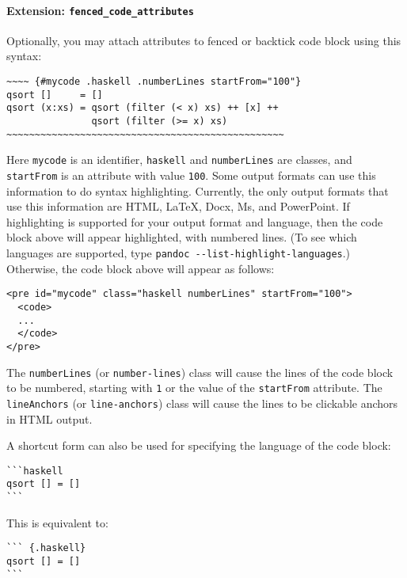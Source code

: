 \documentclass[
]{article}
\begin{document}
\paragraph{\texorpdfstring{Extension:
\texttt{fenced\_code\_attributes}}{Extension: fenced\_code\_attributes}}\label{extension-fenced_code_attributes}

Optionally, you may attach attributes to fenced or backtick code block
using this syntax:

\begin{verbatim}
~~~~ {#mycode .haskell .numberLines startFrom="100"}
qsort []     = []
qsort (x:xs) = qsort (filter (< x) xs) ++ [x] ++
               qsort (filter (>= x) xs)
~~~~~~~~~~~~~~~~~~~~~~~~~~~~~~~~~~~~~~~~~~~~~~~~~
\end{verbatim}

Here \texttt{mycode} is an identifier, \texttt{haskell} and
\texttt{numberLines} are classes, and \texttt{startFrom} is an attribute
with value \texttt{100}. Some output formats can use this information to
do syntax highlighting. Currently, the only output formats that use this
information are HTML, LaTeX, Docx, Ms, and PowerPoint. If highlighting
is supported for your output format and language, then the code block
above will appear highlighted, with numbered lines. (To see which
languages are supported, type
\texttt{pandoc\ -\/-list-highlight-languages}.) Otherwise, the code
block above will appear as follows:

\begin{verbatim}
<pre id="mycode" class="haskell numberLines" startFrom="100">
  <code>
  ...
  </code>
</pre>
\end{verbatim}

The \texttt{numberLines} (or \texttt{number-lines}) class will cause the
lines of the code block to be numbered, starting with \texttt{1} or the
value of the \texttt{startFrom} attribute. The \texttt{lineAnchors} (or
\texttt{line-anchors}) class will cause the lines to be clickable
anchors in HTML output.

A shortcut form can also be used for specifying the language of the code
block:

\begin{verbatim}
```haskell
qsort [] = []
```
\end{verbatim}

This is equivalent to:

\begin{verbatim}
``` {.haskell}
qsort [] = []
```
\end{verbatim}
\end{document}
